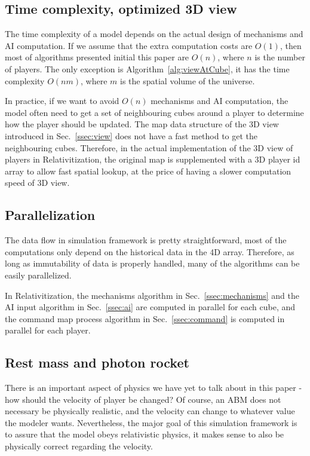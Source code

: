 \documentclass{article}
\begin{document}
\subsection{Time complexity, optimized 3D view}

The time complexity of a model depends on the actual design of mechanisms and AI computation.
If we assume that the extra computation costs are $O(1)$, then most of algorithms presented initial
this paper are $O(n)$, where $n$ is the number of players. The only exception is Algorithm~\ref{alg:viewAtCube},
it has the time complexity $O(n m)$, where $m$ is the spatial volume of the universe.

In practice, if we want to avoid $O(n)$ mechanisms and AI computation,
the model often need to get a set of neighbouring cubes around a player to determine
how the player should be updated. 
The map data structure of the 3D view introduced in Sec.~\ref{ssec:view}
does not have a fast method to get the neighbouring cubes.
Therefore, in the actual implementation of the 3D view of players in Relativitization,
the original map is supplemented with a 3D player id array to allow fast spatial lookup,
at the price of having a slower computation speed of 3D view.

\subsection{Parallelization}

The data flow in simulation framework is pretty straightforward,
most of the computations only depend on the historical data in the 4D array.
Therefore, as long as immutability of data is properly handled,
many of the algorithms can be easily parallelized.

In Relativitization, the mechanisms algorithm in Sec.~\ref{ssec:mechanisms}
and the AI input algorithm in Sec.~\ref{ssec:ai} are computed in parallel for each cube,
and the command map process algorithm in Sec.~\ref{ssec:command} is computed in parallel for each player.

\subsection{Rest mass and photon rocket}

There is an important aspect of physics we have yet to talk about in this paper - how should the velocity of player be changed?
Of course, an ABM does not necessary be physically realistic, and the velocity can change to whatever value
the modeler wants.
Nevertheless, the major goal of this simulation framework is to assure that the model obeys relativistic physics,
it makes sense to also be physically correct regarding the velocity.
\end{document}
